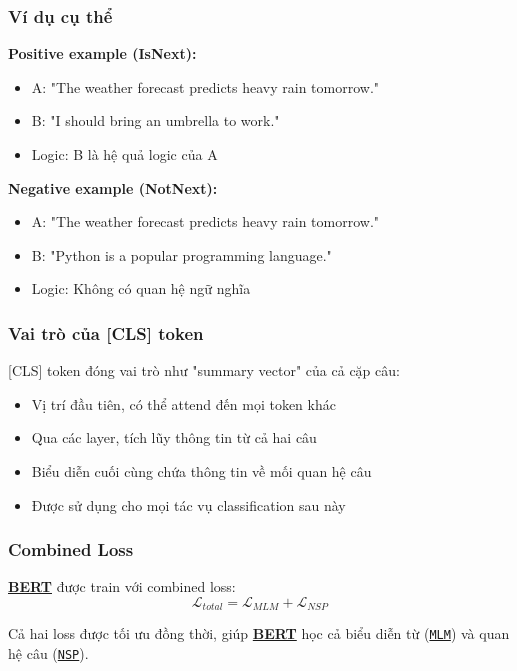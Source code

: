 \subsubsection{Ví dụ cụ thể}
\textbf{Positive example (IsNext):}
\begin{itemize}
    \item A: "The weather forecast predicts heavy rain tomorrow."
    \item B: "I should bring an umbrella to work."
    \item Logic: B là hệ quả logic của A
\end{itemize}

\textbf{Negative example (NotNext):}
\begin{itemize}
    \item A: "The weather forecast predicts heavy rain tomorrow."
    \item B: "Python is a popular programming language."
    \item Logic: Không có quan hệ ngữ nghĩa
\end{itemize}

\subsubsection{Vai trò của [CLS] token}
[CLS] token đóng vai trò như "summary vector" của cả cặp câu:
\begin{itemize}
    \item Vị trí đầu tiên, có thể attend đến mọi token khác
    \item Qua các layer, tích lũy thông tin từ cả hai câu
    \item Biểu diễn cuối cùng chứa thông tin về mối quan hệ câu
    \item Được sử dụng cho mọi tác vụ classification sau này
\end{itemize}

\subsubsection{Combined Loss}
\hyperref[acro:bert]{\textbf{BERT}} được train với combined loss:
$$ \mathcal{L}_{total} = \mathcal{L}_{MLM}
+ \mathcal{L}_{NSP} $$

Cả hai loss được tối ưu đồng thời, giúp \hyperref[acro:bert]{\textbf{BERT}} học cả biểu diễn từ (\hyperref[acro:mlm]{\texttt{MLM}}) và quan hệ câu (\hyperref[acro:nsp]{\texttt{NSP}}).
